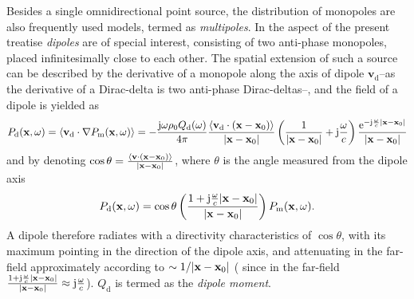 \vspace{3mm}
Besides a single omnidirectional point source, the distribution of monopoles are also frequently used models, termed as \emph{multipoles}. In the aspect of the present treatise \emph{dipoles} are of special interest, consisting of two anti-phase monopoles, placed infinitesimally close to each other. The spatial extension of such a source can be described by the derivative of a monopole along the axis of dipole $\mathbf{v}_{\mathrm{d}}$--as the derivative of a Dirac-delta is two anti-phase Dirac-deltas--, and the field of a dipole is yielded as
\begin{equation}
P_{\mathrm{d}}(\mathbf{x},\omega) = \left< \mathbf{v}_{\mathrm{d}} \cdot \nabla P_{\mathrm{m}}(\mathbf{x},\omega) \right>= -\frac{\mathrm{j} \omega \rho_0 Q_\mathrm{d}(\omega)}{4\pi}\frac{\left<\mathbf{v}_{\mathrm{d}}\cdot (\mathbf{x}-\mathbf{x}_0) \right> } {|\mathbf{x}-\mathbf{x}_0|}\left(  \frac{1}{|\mathbf{x}-\mathbf{x}_0|} + \mathrm{j} \frac{\omega}{c} \right)\frac{\mathrm{e}^{-\mathrm{j} \frac{\omega}{c}|\mathbf{x}-\mathbf{x}_0|}}{|\mathbf{x}-\mathbf{x}_0|}
\end{equation}
and by denoting $\cos \theta = \frac{\left< \mathbf{v}\cdot (\mathbf{x}-\mathbf{x}_0)  \right> } {|\mathbf{x}-\mathbf{x}_0|}$, where $\theta$ is the angle measured from the dipole axis 
\begin{equation}
P_{\mathrm{d}}(\mathbf{x},\omega) = \cos \theta \left( \frac{1 + \mathrm{j} \frac{\omega}{c}|\mathbf{x}-\mathbf{x}_0|}{|\mathbf{x}-\mathbf{x}_0|} \right) P_{\mathrm{m}} (\mathbf{x},\omega).
\end{equation}
A dipole therefore radiates with a directivity characteristics of $\cos \theta$, with its maximum pointing in the direction of the dipole axis, and attenuating in the far-field approximately according to $\sim 1/|\mathbf{x}-\mathbf{x}_0|$ ( since in the far-field $\frac{1 + \mathrm{j} \frac{\omega}{c}|\mathbf{x}-\mathbf{x}_0|}{|\mathbf{x}-\mathbf{x}_0|} \approx \mathrm{j} \frac{\omega}{c}$). $Q_{\mathrm{d}}$ is termed as the \emph{dipole moment}.
 
